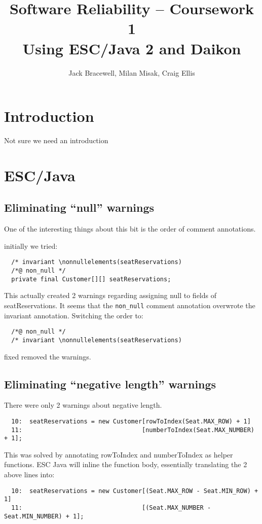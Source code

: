 \documentclass{article}
\title{Software Reliability -- Coursework 1 \\ Using ESC/Java 2 and Daikon}
\author{Jack Bracewell, Milan Misak, Craig Ellis}
\date{}
\begin{document}
\maketitle

\section{Introduction}

Not sure we need an introduction

\section{ESC/Java}

\subsection{Eliminating ``null'' warnings}

One of the interesting things about this bit is the order of comment annotations.

initially we tried:

\begin{verbatim}
  /* invariant \nonnullelements(seatReservations)
  /*@ non_null */
  private final Customer[][] seatReservations;
\end{verbatim}

This actually created 2 warnings regarding assigning null to fields of seatReservations. It seems that the
\verb|non_null| comment annotation overwrote the invariant annotation. Switching the order to:
\begin{verbatim}
  /*@ non_null */
  /* invariant \nonnullelements(seatReservations)
\end{verbatim}
fixed removed the warnings.

\subsection{Eliminating ``negative length'' warnings}

There were only 2 warnings about negative length.

\begin{verbatim}
  10:  seatReservations = new Customer[rowToIndex(Seat.MAX_ROW) + 1]
  11:                                 [numberToIndex(Seat.MAX_NUMBER) + 1];
\end{verbatim}

This was solved by annotating rowToIndex and numberToIndex as helper functions. ESC Java
will inline the function body, essentially translating the 2 above lines into:
\begin{verbatim}
  10:  seatReservations = new Customer[(Seat.MAX_ROW - Seat.MIN_ROW) + 1]
  11:                                 [(Seat.MAX_NUMBER - Seat.MIN_NUMBER) + 1];
\end{verbatim}
\end{document}
